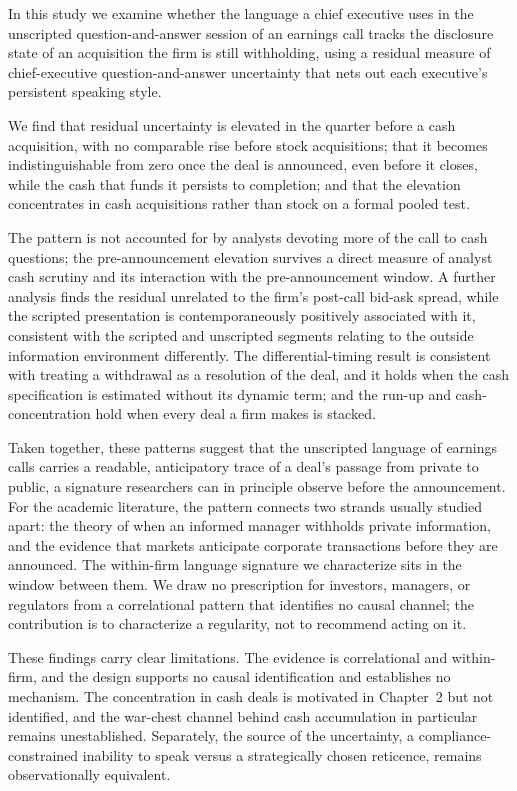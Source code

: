 In this study we examine whether the language a chief executive uses in the unscripted question-and-answer session of an earnings call tracks the disclosure state of an acquisition the firm is still withholding, using a residual measure of chief-executive question-and-answer uncertainty that nets out each executive's persistent speaking style.

We find that residual uncertainty is elevated in the quarter before a cash acquisition, with no comparable rise before stock acquisitions; that it becomes indistinguishable from zero once the deal is announced, even before it closes, while the cash that funds it persists to completion; and that the elevation concentrates in cash acquisitions rather than stock on a formal pooled test.

The pattern is not accounted for by analysts devoting more of the call to cash questions; the pre-announcement elevation survives a direct measure of analyst cash scrutiny and its interaction with the pre-announcement window. A further analysis finds the residual unrelated to the firm's post-call bid-ask spread, while the scripted presentation is contemporaneously positively associated with it, consistent with the scripted and unscripted segments relating to the outside information environment differently. The differential-timing result is consistent with treating a withdrawal as a resolution of the deal, and it holds when the cash specification is estimated without its dynamic term; and the run-up and cash-concentration hold when every deal a firm makes is stacked.

Taken together, these patterns suggest that the unscripted language of earnings calls carries a readable, anticipatory trace of a deal's passage from private to public, a signature researchers can in principle observe before the announcement. For the academic literature, the pattern connects two strands usually studied apart: the theory of when an informed manager withholds private information, and the evidence that markets anticipate corporate transactions before they are announced. The within-firm language signature we characterize sits in the window between them. We draw no prescription for investors, managers, or regulators from a correlational pattern that identifies no causal channel; the contribution is to characterize a regularity, not to recommend acting on it.

These findings carry clear limitations. The evidence is correlational and within-firm, and the design supports no causal identification and establishes no mechanism. The concentration in cash deals is motivated in Chapter~2 but not identified, and the war-chest channel behind cash accumulation in particular remains unestablished. Separately, the source of the uncertainty, a compliance-constrained inability to speak versus a strategically chosen reticence, remains observationally equivalent.

